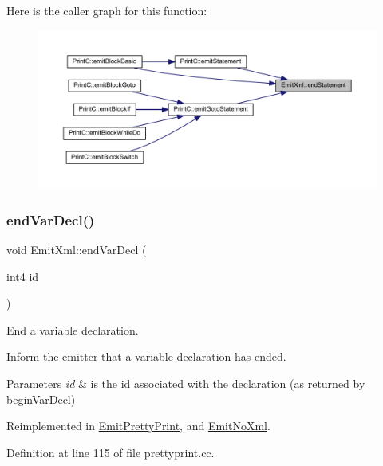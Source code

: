 Here is the caller graph for this function\+:
\nopagebreak
\begin{figure}[H]
\begin{center}
\leavevmode
\includegraphics[width=350pt]{class_emit_xml_a179b45bd8929a464f8fbc622de96f399_icgraph}
\end{center}
\end{figure}
\mbox{\label{class_emit_xml_a8700bdf9d4e073ae392ef722f53ceb45}} 
\subsubsection{\texorpdfstring{endVarDecl()}{endVarDecl()}}
{\footnotesize\ttfamily void Emit\+Xml\+::end\+Var\+Decl (\begin{DoxyParamCaption}\item[{int4}]{id }\end{DoxyParamCaption})\hspace{0.3cm}{\ttfamily [virtual]}}



End a variable declaration. 

Inform the emitter that a variable declaration has ended. 
\begin{DoxyParams}{Parameters}
{\em id} & is the id associated with the declaration (as returned by begin\+Var\+Decl) \\
\hline
\end{DoxyParams}


Reimplemented in \mbox{\hyperlink{class_emit_pretty_print_a468af036c0623c76311ea4d286940936}{Emit\+Pretty\+Print}}, and \mbox{\hyperlink{class_emit_no_xml_ae6d306b10be8c8dfc62cea71ab2272b9}{Emit\+No\+Xml}}.



Definition at line 115 of file prettyprint.\+cc.

